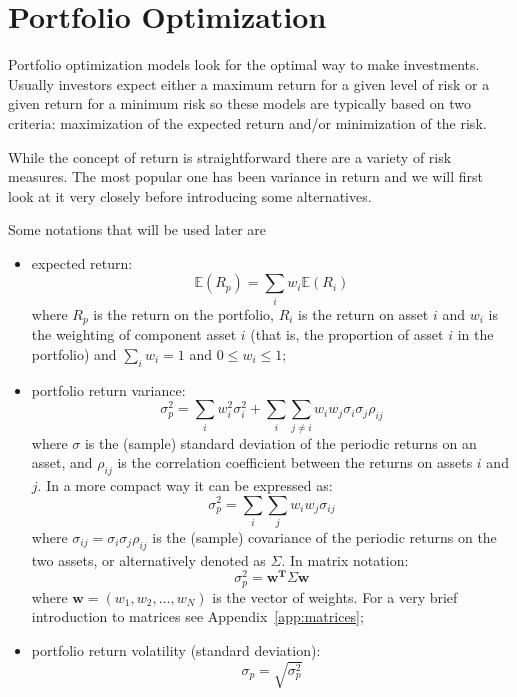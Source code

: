 \chapter{Portfolio Optimization}\label{portfolio-optimization}

Portfolio optimization models look for the optimal way to make investments. Usually investors expect either a maximum return for a given level of risk or a given return for a minimum risk so these models are typically based on two criteria: maximization of the expected return and/or minimization of the risk.

While the concept of return is straightforward there are a variety of risk measures. The most popular one has been variance in return and we will first look at it very closely before introducing some alternatives.

Some notations that will be used later are

\begin{itemize}
\tightlist
\item
  expected return: 
  \begin{equation} 
  	\mathbb{E}(R_{p}) = \sum _{i}w_{i} \mathbb{E}(R_{i}) 
  \end{equation} 
  where \(R_{p}\) is the return on the portfolio, \(R_{i}\) is the return on
  asset \(i\) and \(w_{i}\) is the weighting of component asset \(i\)
  (that is, the proportion of asset \(i\) in the portfolio) and
  \(\sum_{i}w_i = 1\) and \(0 \le w_i \le 1\);
\item
  portfolio return variance:
  \begin{equation} 
 	\sigma _{p}^{2} = \sum _{i}w_{i}^{2}\sigma _{i}^{2} + \sum _{i}\sum _{j\neq i}w_{i}w_{j}\sigma _{i}\sigma _{j}\rho _{ij} \end{equation}
  where \(\sigma\) is the (sample) standard deviation of the periodic
  returns on an asset, and \(\rho _{ij}\) is the correlation coefficient
  between the returns on assets \(i\) and \(j\). In a more compact way
  it can be expressed as:
  \begin{equation} 
  	\sigma _{p}^{2}=\sum _{i}\sum _{j}w_{i}w_{j}\sigma _{ij} 
  \end{equation} 
  where \(\sigma _{ij}=\sigma _{i}\sigma _{j}\rho _{ij}\) is the (sample)
  covariance of the periodic returns on the two assets, or alternatively
  denoted as \(\Sigma\).
  In matrix notation:
  \begin{equation}
  	\sigma_p^2 = \mathbf{w^T}\Sigma\mathbf{w} 
  \end{equation}
  where $\mathbf{w} = (w_1,w_2,\ldots,w_N)$ is the vector of weights. 
  For a very brief introduction to matrices see Appendix~\ref{app:matrices};
\item
  portfolio return volatility (standard deviation):
  \begin{equation}
  	\sigma _{p}= \sqrt{\sigma _{p}^{2}}
  \end{equation}
\end{itemize}

